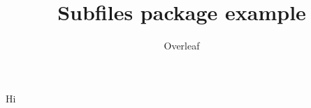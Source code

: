 \documentclass{exam}
\title{Subfiles package example}
\author{Overleaf}
\date{ }
\begin{document}
Hi
\end{document}
